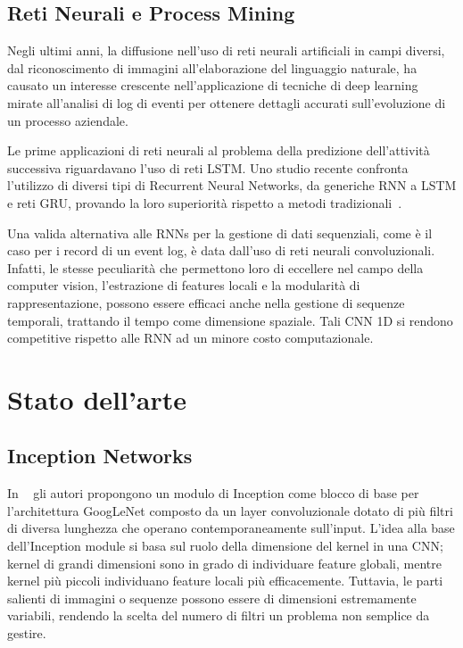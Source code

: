 \documentclass[12pt,a4paper]{report}
\begin{document}
    \newpage
    \section{Reti Neurali e Process Mining}
    \medskip
    Negli ultimi anni, la diffusione nell'uso di reti
    neurali artificiali in campi diversi, dal
    riconoscimento di immagini all'elaborazione del 
    linguaggio naturale, ha causato un interesse 
    crescente nell'applicazione di tecniche di deep 
    learning mirate all'analisi di log di eventi per
    ottenere dettagli accurati sull'evoluzione di
    un processo aziendale.

    \medskip
    Le prime applicazioni di reti neurali al problema
    della predizione dell'attivit\`a successiva
    riguardavano l'uso di reti LSTM. Uno studio recente 
    confronta l'utilizzo  di diversi tipi di Recurrent 
    Neural Networks, da generiche RNN a LSTM e reti GRU,
    provando la loro superiorit\`a rispetto a metodi 
    tradizionali~\cite{Lecun-et-al-2000}.

    Una valida alternativa alle RNNs per la gestione di 
    dati sequenziali, come \`e il caso per i record di un
    event log, \`e data dall'uso di reti neurali
    convoluzionali. Infatti, le stesse 
    peculiarit\`a che permettono loro di eccellere nel
    campo della computer vision, l'estrazione di features
    locali e la modularit\`a di rappresentazione, possono
    essere efficaci anche nella gestione di sequenze
    temporali, trattando il tempo come dimensione spaziale.
    Tali CNN 1D si rendono competitive rispetto 
    alle RNN ad un minore costo computazionale.

    \chapter{Stato dell'arte}
        \section{Inception Networks}
        In ~\cite{DBLP:journals/corr/SzegedyLJSRAEVR14} gli
        autori propongono un modulo di Inception come blocco
        di base per l'architettura GoogLeNet composto da un
        layer convoluzionale dotato di pi\`u filtri di diversa
        lunghezza che operano contemporaneamente sull'input.
        L'idea alla base dell'Inception module si basa sul
        ruolo della dimensione del kernel in una CNN; kernel 
        di grandi dimensioni sono in grado di individuare feature 
        globali, mentre kernel pi\`u piccoli individuano feature 
        locali pi\`u efficacemente. Tuttavia, le parti salienti di 
        immagini o sequenze possono essere di dimensioni estremamente 
        variabili, rendendo la scelta del numero di filtri un problema
        non semplice da gestire. 
\end{document}

